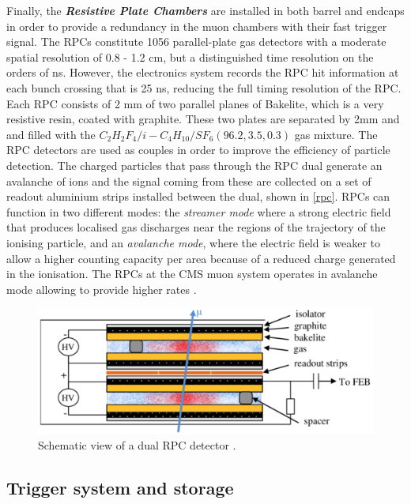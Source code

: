 Finally, the \emph{\textbf{Resistive Plate Chambers}} are installed in both barrel and endcaps in order to provide a redundancy in the muon chambers with their fast trigger signal. The RPCs constitute 1056 parallel-plate gas detectors with a moderate spatial resolution of 0.8 - 1.2 cm, but a distinguished time resolution on the orders of ns. However, the electronics system records the RPC hit information at each bunch crossing that is 25 ns, reducing the full timing resolution of the RPC. Each RPC consists of 2 mm of two parallel planes of Bakelite, which is a very resistive resin, coated with graphite. These two plates are separated by 2mm and and filled with the $C_2H_2F_4/i-C_4H_{10}/SF_6 (96.2, 3.5, 0.3)$ gas mixture. The RPC detectors are used as couples in order to improve the efficiency of particle detection. The charged particles that pass through the RPC dual generate an avalanche of ions and the signal coming from these are collected on a set of readout aluminium strips installed between the dual, shown in \autoref{rpc}. RPCs can function in two different modes: the \emph{streamer mode} where a strong electric field that produces localised gas discharges near the regions of the trajectory of the ionising particle, and an \emph{avalanche mode}, where the electric field is weaker to allow a higher counting capacity per area because of a reduced charge generated in the ionisation. The RPCs at the CMS muon system operates in avalanche mode allowing to provide higher rates \cite{Sirunyan_2018}.

\begin{figure}[ht]
	\centering
	\includegraphics[width=\textwidth]{rpc.png}
	\vspace{2mm}
	\caption[Schematic view of a dual RPC detector.]{Schematic view of a dual RPC detector \cite{IanCrotty}.}
	\label{rpc}
\end{figure}

\subsection{Trigger system and storage}

